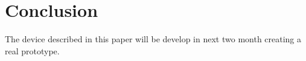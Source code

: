 \documentclass[conference]{IEEEtran}
\begin{document}

 










\endgroup






	
\section{Conclusion}
	The device described in this paper will be develop in  next two month creating a real prototype.
	




\end{document}
